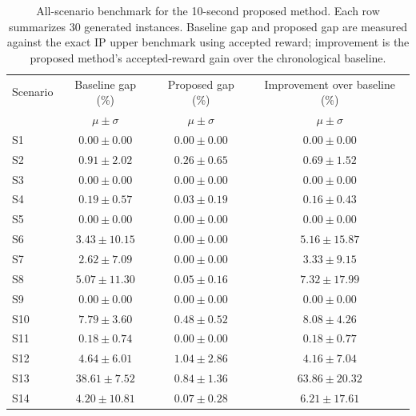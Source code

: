 \begin{table}[ht]
\centering
\small
\setlength{\tabcolsep}{5pt}
\begin{tabular}{lccc}
\toprule
Scenario & Baseline gap (\%) & Proposed gap (\%) & Improvement over baseline (\%)\\
& $\mu \pm \sigma$ & $\mu \pm \sigma$ & $\mu \pm \sigma$\\
\midrule
S1  & $0.00 \pm 0.00$ & $0.00 \pm 0.00$ & $0.00 \pm 0.00$\\
S2  & $0.91 \pm 2.02$ & $0.26 \pm 0.65$ & $0.69 \pm 1.52$\\
S3  & $0.00 \pm 0.00$ & $0.00 \pm 0.00$ & $0.00 \pm 0.00$\\
S4  & $0.19 \pm 0.57$ & $0.03 \pm 0.19$ & $0.16 \pm 0.43$\\
S5  & $0.00 \pm 0.00$ & $0.00 \pm 0.00$ & $0.00 \pm 0.00$\\
S6  & $3.43 \pm 10.15$ & $0.00 \pm 0.00$ & $5.16 \pm 15.87$\\
S7  & $2.62 \pm 7.09$ & $0.00 \pm 0.00$ & $3.33 \pm 9.15$\\
S8  & $5.07 \pm 11.30$ & $0.05 \pm 0.16$ & $7.32 \pm 17.99$\\
S9  & $0.00 \pm 0.00$ & $0.00 \pm 0.00$ & $0.00 \pm 0.00$\\
S10 & $7.79 \pm 3.60$ & $0.48 \pm 0.52$ & $8.08 \pm 4.26$\\
S11 & $0.18 \pm 0.74$ & $0.00 \pm 0.00$ & $0.18 \pm 0.77$\\
S12 & $4.64 \pm 6.01$ & $1.04 \pm 2.86$ & $4.16 \pm 7.04$\\
S13 & $38.61 \pm 7.52$ & $0.84 \pm 1.36$ & $63.86 \pm 20.32$\\
S14 & $4.20 \pm 10.81$ & $0.07 \pm 0.28$ & $6.21 \pm 17.61$\\
\bottomrule
\end{tabular}
\caption{All-scenario benchmark for the 10-second proposed method.
Each row summarizes 30 generated instances. Baseline gap and proposed gap
are measured against the exact IP upper benchmark using accepted reward;
improvement is the proposed method's accepted-reward gain over the
chronological baseline.}
\end{table}
